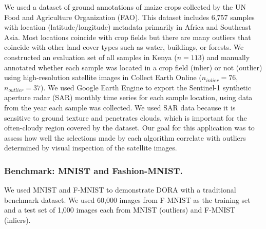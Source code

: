 \documentclass[letterpaper]{article} %
\newcommand{\todo}[1]{\textcolor{blue}{#1}}
\begin{document}
 We used a dataset of ground annotations of maize crops collected by the UN Food
 and Agriculture Organization (FAO). This dataset includes 6,757 samples
 with location (latitude/longitude) metadata primarily in Africa and Southeast
 Asia. Most locations coincide with crop
 fields but there are many outliers that coincide with other land cover types 
 such as water, buildings, or forests. We constructed an evaluation set 
 of all samples in Kenya ($n=113$) and manually annotated whether 
 each sample was located in a crop field (inlier) or not (outlier)
 using high-resolution satellite images in Collect Earth 
 Online ($n_{inlier}=76$, $n_{outlier}=37$). We used Google
 Earth Engine to export the Sentinel-1 synthetic aperture radar (SAR) monthly
 time series for each sample location, using data from the year each sample was 
 collected. We used SAR data because it is sensitive to ground texture and
  penetrates clouds, which is important for the often-cloudy region covered
  by the dataset. Our goal for this application was to assess how well the 
  selections made by each algorithm correlate with outliers determined by
  visual inspection of the satellite images.


\subsubsection{Benchmark: MNIST and Fashion-MNIST.}
We used MNIST and F-MNIST to demonstrate DORA with a
traditional benchmark dataset. We used 60,000 images from 
F-MNIST as the training set and a test set of 1,000 images each from MNIST (outliers) and F-MNIST (inliers). 
\end{document}
